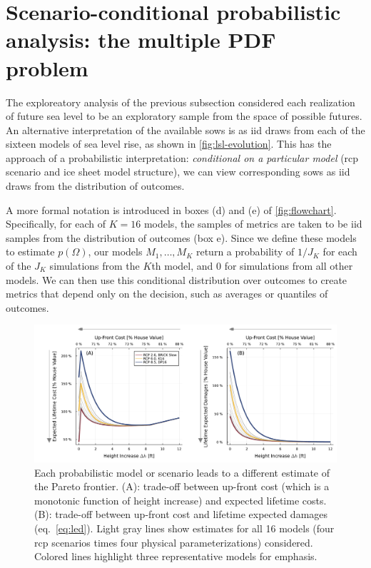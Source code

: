 \documentclass[12pt]{article}
\begin{document}
\section{Scenario-conditional probabilistic analysis: the multiple PDF problem}\label{sec:multiple-pdf}

The exploreatory analysis of the previous subsection considered each realization of future sea level to be an exploratory sample from the space of possible futures.
An alternative interpretation of the available \glspl{sow} is as \gls{iid} draws from each of the sixteen models of sea level rise, as shown in \cref{fig:lsl-evolution}.
This has the approach of a probabilistic interpretation: \emph{conditional on a particular model} (\gls{rcp} scenario and ice sheet model structure), we can view corresponding \glspl{sow} as \gls{iid} draws from the distribution of outcomes.

A more formal notation is introduced in boxes (d) and (e) of \cref{fig:flowchart}.
Specifically, for each of $K=16$ models, the samples of metrics are taken to be \gls{iid} samples from the distribution of outcomes (box e).
Since we define these models to estimate $p(\Omega)$, our models $M_1, \ldots, M_K$ return a probability of $1 / J_K$ for each of the $J_K$ simulations from the $K$th model, and $0$ for simulations from all other models.
We can then use this conditional distribution over outcomes to create metrics that depend only on the decision, such as averages or quantiles of outcomes.

\begin{figure}
    \centering
    \includegraphics[width=\textwidth]{tradeoffs-by-rcp}
    \caption{
        Each probabilistic model or scenario leads to a different estimate of the Pareto frontier.
        (A): trade-off between up-front cost (which is a monotonic function of height increase) and expected lifetime costs.
        (B): trade-off between up-front cost and lifetime expected damages (eq.~\ref{eq:led}).
        Light gray lines show estimates for all 16 models (four \gls{rcp} scenarios times four physical parameterizations) considered.
        Colored lines highlight three representative models for emphasis.
    }\label{fig:tradeoffs-by-rcp}
\end{figure}
\end{document}
